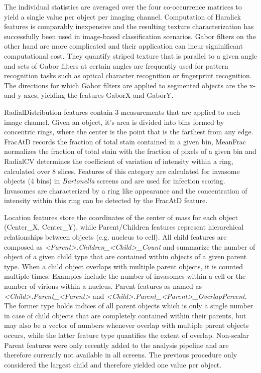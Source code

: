 The individual statistics are averaged over the four co-occurrence matrices to yield a single value per object per imaging channel. Computation of Haralick features is comparably inexpensive and the resulting texture characterization has successfully been used in image-based classification scenarios. Gabor filters on the other hand are more complicated and their application can incur signinificant computational cost. They quantify striped texture that is parallel to a given angle and sets of Gabor filters at certain angles are frequently used for pattern recognition tasks such as optical character recognition or fingerprint recognition. The directions for which Gabor filters are applied to segmented objects are the x- and y-axes, yielding the features GaborX and GaborY.

RadialDistribution features contain 3 measurements that are applied to each image channel. Given an object, it's area is divided into bins formed by concentric rings, where the center is the point that is the farthest from any edge. FracAtD records the fraction of total stain contained in a given bin, MeanFrac normalizes the fraction of total stain with the fraction of pixels of a given bin and RadialCV determines the coefficient of variation of intensity within a ring, calculated over 8 slices. Features of this category are calculated for invasome objects (4 bins) in \textit{Bartonella} screens and are used for infection scoring. Invasomes are characterized by a ring like appearance and the concentration of intensity within this ring can be detected by the FracAtD feature.

Location features store the coordinates of the center of mass for each object (Center\_X, Center\_Y), while Parent\slash Children features represent hierarchical relationships between objects (e.g. nucleus to cell). All child features are composed as \textit{<Parent>.Children\_<Child>\_Count} and summarize the number of object of a given child type that are contained within objects of a given parent type. When a child object overlaps with multiple parent objects, it is counted multiple times. Examples include the number of invasomes within a cell or the number of virions within a nucleus. Parent features as named as \textit{<Child>.Parent\_<Parent>} and \textit{<Child>.Parent\_<Parent>\_OverlapPercent}. The former type holds indices of all parent objects which is only a single number in case of child objects that are completely contained within their parents, but may also be a vector of numbers whenever overlap with multiple parent objects occurs, while the latter feature type quantifies the extent of overlap. Non-scalar Parent features were only recently added to the analysis pipeline and are therefore currently not available in all screens. The previous procedure only considered the largest child and therefore yielded one value per object.

